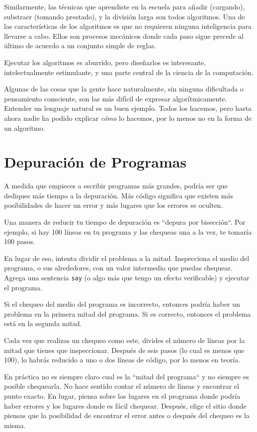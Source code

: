 Similarmente, las técnicas que aprendiste en la escuela
para añadir (cargando), substraer (tomando prestado), y la
división larga son todos algoritmos. Una de las características
de los algoritmos es que no requieren ninguna inteligencia
para llevarse a cabo. Ellos son procesos mecánicos donde
cada paso sigue precede al último de acuerdo a un conjunto simple
de reglas.

Ejecutar los algoritmos es aburrido, pero diseñarlos es interesante,
intelectualmente estimulante, y una parte central de la ciencia de 
la computación.

Algunas de las cosas que la gente hace naturalmente, sin ninguna 
dificultada o pensamiento consciente, son las más difícil de 
expresar algorítmicamente. Entender un lenguaje natural es un buen
ejemplo. Todos los hacemos, pero hasta ahora nadie ha podido explicar
{\em cómo} lo hacemos, por lo menos no en la forma de un algoritmo.


\section{Depuración de Programas}
\label{bisectbug}

A medida que empieces a escribir programas más grandes, podría ser
que dediques más tiempo a la depuración. Más código significa que existen
más posibilidades de hacer un error y más lugares que los errores
se oculten.

Una manera de reducir tu tiempo de depuración es ``depura por bisección``.
Por ejemplo, si hay 100 líneas en tu programa y las chequeas una a la vez,
te tomaría 100 pasos.

En lugar de eso, intenta dividir el problema a la mitad. Inspecciona
el medio del programa, o sus alrededores, con un valor intermedio
que puedas chequear. Agrega una sentencia {\tt say} (o algo más 
que tengo un efecto verificable) y ejecutar el programa.

Si el chequeo del medio del programa es incorrecto, entonces podría haber un
problema en la primera mitad del programa. Si es correcto, entonces
el problema está en la segunda mitad.

Cada vez que realizas un chequeo como este, divides el número de 
líneas por la mitad que tienes que inspeccionar. Después de seis pasos
(lo cual es menos que 100), lo habrás reducido a uno o dos líneas de
código, por lo menos en teoría.

En práctica no es siempre claro cual es la ``mitad del programa``
y no siempre es posible chequearla. No hace sentido contar el número de 
líneas y encontrar el punto exacto. En lugar, piensa sobre los lugares
en el programa donde podría haber errores y los lugares donde es fácil
chequear. Después, elige el sitio donde piensas que la posibilidad de
encontrar el error antes o después del chequeo es la misma.



